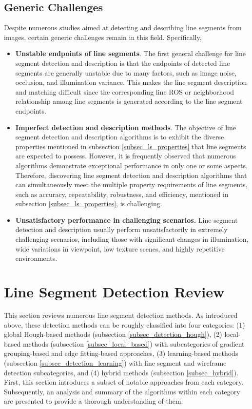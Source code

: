 \documentclass[journal,compsoc]{IEEEtran}
\begin{document}
\subsection{Generic Challenges}
\label{subsec_generic_challenges}
Despite numerous studies aimed at detecting and describing line segments from images, certain generic challenges remain in this field. Specifically,
\begin{itemize}
	\item \textbf{Unstable endpoints of line segments}. The first general challenge for line segment detection and description is that the endpoints of detected line segments are generally unstable due to many factors, such as image noise, occlusion, and illumination variance. This makes the line segment description and matching difficult since the corresponding line ROS or neighborhood relationship among line segments is generated according to the line segment endpoints.
		
\item \textbf{Imperfect detection and description methods}. The objective of line segment detection and description algorithms is to exhibit the diverse properties mentioned in subsection \ref{subsec_ls_properties} that line segments are expected to possess. However, it is frequently observed that numerous algorithms demonstrate exceptional performance in only one or some aspects. Therefore, discovering line segment detection and description algorithms that can simultaneously meet the multiple property requirements of line segments, such as accuracy, repeatability, robustness, and efficiency, mentioned in subsection \ref{subsec_ls_properties}, is challenging.
		
\item \textbf{Unsatisfactory performance in challenging scenarios.} Line segment detection and description usually perform unsatisfactorily in extremely challenging scenarios, including those with significant changes in illumination, wide variations in viewpoint, low texture scenes, and highly repetitive environments.
\end{itemize}




\section{Line Segment Detection Review}
\label{sec_line_detection}
This section reviews numerous line segment detection methods. As introduced above, these detection methods can be roughly classified into four categories: (1) global Hough-based methods (subsection \ref{subsec_detection_hough}), (2) local-based methods (subsection \ref{subsec_local_based}) with subcategories of gradient grouping-based and edge fitting-based approaches, (3) learning-based methods (subsection \ref{subsec_detection_learning}) with line segment and wireframe detection subcategories, and (4) hybrid methods (subsection \ref{subsec_hybrid}). First, this section introduces a subset of notable approaches from each category. Subsequently, an analysis and summary of the algorithms within each category are presented to provide a thorough understanding of them.
\end{document}
